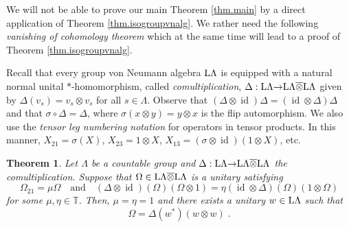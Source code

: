 \documentclass[a4paper,11pt]{amsart}
\numberwithin{equation}{section}
\newtheorem{theorem}[definition]{Theorem}
\begin{document}
We will not be able to prove our main Theorem \ref{thm.main} by a direct application of Theorem \ref{thm.isogroupvnalg}. We rather need the following \emph{vanishing of cohomology theorem} which at the same time will lead to a proof of Theorem \ref{thm.isogroupvnalg}.

Recall that every group von Neumann algebra ${\mathord{\text{\rm L}}} \Lambda$ is equipped with a natural normal unital $*$-homomorphism, called \emph{comultiplication}, ${\Delta} : {\mathord{\text{\rm L}}} \Lambda {\rightarrow} {\mathord{\text{\rm L}}} \Lambda {\mathbin{\overline{\otimes}}} {\mathord{\text{\rm L}}} \Lambda$ given by ${\Delta}(v_s) = v_s {\otimes} v_s$ for all $s \in \Lambda$. Observe that $({\Delta} {\otimes} {\mathord{\operatorname{id}}}){\Delta} = ({\mathord{\operatorname{id}}} {\otimes} {\Delta}){\Delta}$ and that ${\sigma} \circ {\Delta} = {\Delta}$, where ${\sigma}(x {\otimes} y) = y {\otimes} x$ is the flip automorphism.
We also use the \emph{tensor leg numbering notation} for operators in tensor products. In this manner, $X_{21} = {\sigma}(X)$, $X_{23} = 1 {\otimes} X$, $X_{13} = ({\sigma} {\otimes} {\mathord{\operatorname{id}}})(1 {\otimes} X)$, etc.

\begin{theorem} \label{thm.triv-2-coc}
Let $\Lambda$ be a countable group and ${\Delta} : {\mathord{\text{\rm L}}} \Lambda {\rightarrow} {\mathord{\text{\rm L}}} \Lambda {\mathbin{\overline{\otimes}}} {\mathord{\text{\rm L}}} \Lambda$ the comultiplication. Suppose that ${\Omega} \in {\mathord{\text{\rm L}}} \Lambda {\mathbin{\overline{\otimes}}} {\mathord{\text{\rm L}}} \Lambda$ is a unitary satisfying
$$\Omega_{21} = \mu \Omega \quad\text{and}\quad ({\Delta} {\otimes} {\mathord{\operatorname{id}}})({\Omega}) ({\Omega} {\otimes} 1) = \eta ({\mathord{\operatorname{id}}} {\otimes} {\Delta})({\Omega}) (1 {\otimes} {\Omega})$$
for some $\mu,\eta \in {\mathbb{T}}$. Then, $\mu = \eta = 1$ and there exists a unitary $w \in {\mathord{\text{\rm L}}} \Lambda$ such that
$$\Omega = {\Delta}(w^*) (w {\otimes} w) \; .$$
\end{theorem}
\end{document}
